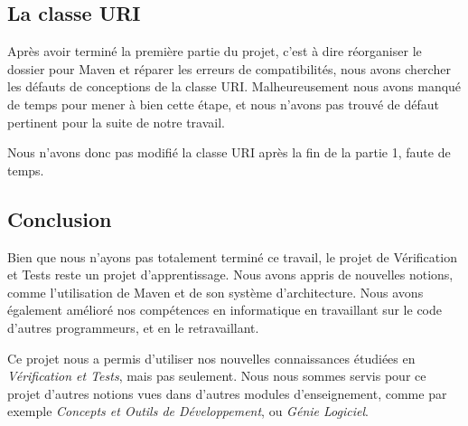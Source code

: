 \documentclass[a4paper]{article}
\begin{document}
		\vspace{0.5cm}

		\subsection{La classe URI}

		\vspace{0.5cm}

			Après avoir terminé la première partie du projet, c'est à dire réorganiser le dossier pour Maven et réparer les erreurs de compatibilités, nous avons chercher les défauts de conceptions de la classe URI. Malheureusement nous avons manqué de temps pour mener à bien cette étape, et nous n'avons pas trouvé de défaut pertinent pour la suite de notre travail.

Nous n'avons donc pas modifié la classe URI après la fin de la partie 1, faute de temps.

			\newpage

	\begin{center}
		\section{Conclusion}
	\end{center}	
		Bien que nous n'ayons pas totalement terminé ce travail, le projet de Vérification et Tests reste un projet d'apprentissage. Nous avons appris de nouvelles notions, comme l'utilisation de Maven et de son système d'architecture. Nous avons également amélioré nos compétences en informatique en travaillant sur le code d'autres programmeurs, et en le retravaillant.

		\vspace{0.5cm}

		Ce projet nous a permis d'utiliser nos nouvelles connaissances étudiées en \textit{Vérification et Tests}, mais pas seulement. Nous nous sommes servis pour ce projet d'autres notions vues dans d'autres modules d'enseignement, comme par exemple \textit{Concepts et Outils de Développement}, ou \textit{Génie Logiciel}.
 
\end{document}
